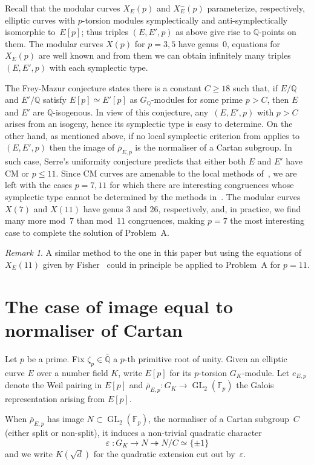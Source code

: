 \documentclass[12pt]{amsart}
\newcommand{\F}{\mathbb{F}}
\newcommand{\Q}{\mathbb{Q}}
\newcommand{\Qbar}{{\overline{\Q}}}
\newcommand{\rhobar}{{\overline{\rho}}}
\newcommand{\eps}{\varepsilon}
\newcommand{\GL}{\operatorname{GL}}
\numberwithin{equation}{section}
\theoremstyle{definition}
\theoremstyle{remark}
\newtheorem{remark}[theorem]{Remark}
\begin{document}
Recall that the modular curves $X_E(p)$ and $X_E^-(p)$ parameterize, respectively, elliptic curves with $p$-torsion modules symplectically and anti-symplectically isomorphic to~$E[p]$; thus triples $(E,E',p)$ as above give rise to $\Q$-points on them. The modular curves $X(p)$ for $p=3,5$ have genus~0, equations for $X_E(p)$ are well known and from them we can obtain infinitely many triples $(E,E',p)$ with each symplectic type.


The Frey-Mazur conjecture states there is a constant $C \geq 18$ such
that, if $E/\Q$ and $E'/\Q$ satisfy $E[p] \simeq E'[p]$ as
$G_\Q$-modules for some prime $p > C$, then $E$ and $E'$ are
$\Q$-isogenous. In view of this conjecture, any~$(E,E',p)$ with $p >
C$ arises from an isogeny, hence its symplectic type is easy to
determine. On the other hand, as mentioned above, if no local
symplectic criterion from \cite{FKSym} applies to~$(E,E',p)$ then the
image of $\rhobar_{E,p}$ is the normaliser of a Cartan subgroup. In
such case, Serre's uniformity conjecture predicts that either both $E$
and $E'$ have CM or $p \le 11$.  Since CM curves are amenable to the
local methods of~\cite{FKSym}, we are left with the cases $p=7,11$ for
which there are interesting congruences whose symplectic type cannot
be determined by the methods in~\cite{FKSym}.  The modular curves
$X(7)$ and $X(11)$ have genus 3 and 26, respectively, and, in
practice, we find many more mod~$7$ than mod~$11$ congruences, making
$p=7$ the most interesting case to complete the solution of Problem~A.


\begin{remark}
A similar method to the one in this paper but using the equations of $X_E(11)$ given by Fisher~\cite{Fisher} 
could in principle be applied to Problem~A for $p=11$. 
\end{remark}

\section{The case of image equal to normaliser of Cartan}

Let $p$ be a prime. Fix $\zeta_p \in \Qbar$ a $p$-th primitive root of
unity.  Given an elliptic curve $E$ over a number field $K$, write
$E[p]$ for its $p$-torsion $G_K$-module. Let $e_{E,p}$ denote the Weil
pairing in $E[p]$ and $\rhobar_{E,p} : G_K \to \GL_2(\F_p)$ the Galois
representation arising from $E[p]$.

When $\rhobar_{E,p}$ has image $N \subset \GL_2(\F_p)$, the normaliser
of a Cartan subgroup~$C$ (either split or non-split), it induces a
non-trivial quadratic character
\[
 \eps \; : G_K \to N \twoheadrightarrow N/C \simeq \{\pm 1 \}
\]
and we write $K(\sqrt{d})$ for the quadratic extension cut out
by~$\eps$.
\end{document}
